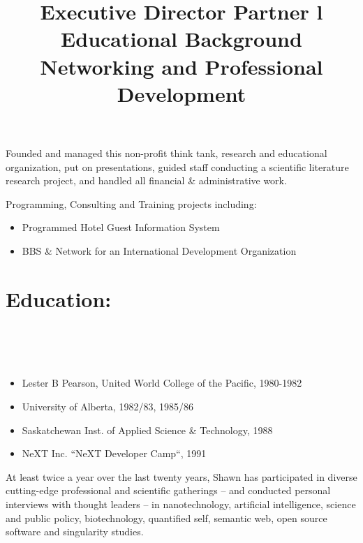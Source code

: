 \begin{resume}
\title{ Executive Director }
\begin{position}
Founded and managed this non-profit think tank, research and educational 
organization, put on presentations, guided staff conducting a scientific 
literature research project, and handled all financial \& administrative work.
\end{position}



\title{ Partner }
\begin{position}
Programming, Consulting and Training projects including:
\begin{itemize}
\item Programmed Hotel Guest Information System
\item BBS \& Network for an International Development Organization
\end{itemize}

\end{position}


\section{Education:}

\begin{format}
\title{l}\\
\\
\body\\
\end{format}

\title{ Educational Background }
\begin{itemize}
\item Lester B Pearson, United World College of the Pacific, 1980-1982
\item University of Alberta, 1982/83, 1985/86
\item Saskatchewan Inst. of Applied Science \& Technology, 1988
\item NeXT Inc. ``NeXT Developer Camp``, 1991
\end{itemize}

\title{ Networking and Professional Development }
\employer{}
\begin{position}
At least twice a year over the last twenty years, Shawn has participated
in diverse cutting-edge professional and scientific gatherings -- 
and conducted personal interviews with thought leaders -- in nanotechnology, 
artificial intelligence, science and public policy, biotechnology, 
quantified self, semantic web, open source software and singularity studies.
\end{position}




\end{resume}
